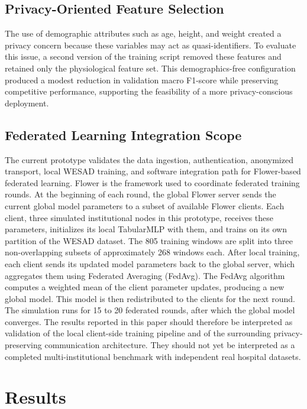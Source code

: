\documentclass[12pt]{article}
\begin{document}
\subsection{Privacy-Oriented Feature Selection}

The use of demographic attributes such as age, height, and weight created a privacy concern because these variables may act as quasi-identifiers. To evaluate this issue, a second version of the training script removed these features and retained only the physiological feature set. This demographics-free configuration produced a modest reduction in validation macro F1-score while preserving competitive performance, supporting the feasibility of a more privacy-conscious deployment.

\subsection{Federated Learning Integration Scope}

The current prototype validates the data ingestion, authentication, anonymized transport, local WESAD training, and software integration path for Flower-based federated learning. Flower is the framework used to coordinate federated training rounds. At the beginning of each round, the global Flower server sends the current global model parameters to a subset of available Flower clients. Each client, three simulated institutional nodes in this prototype, receives these parameters, initializes its local TabularMLP with them, and trains on its own partition of the WESAD dataset. The 805 training windows are split into three non-overlapping subsets of approximately 268 windows each. After local training, each client sends its updated model parameters back to the global server, which aggregates them using Federated Averaging (FedAvg). The FedAvg algorithm computes a weighted mean of the client parameter updates, producing a new global model. This model is then redistributed to the clients for the next round. The simulation runs for 15 to 20 federated rounds, after which the global model converges. The results reported in this paper should therefore be interpreted as validation of the local client-side training pipeline and of the surrounding privacy-preserving communication architecture. They should not yet be interpreted as a completed multi-institutional benchmark with independent real hospital datasets.

\section{Results}
\end{document}
